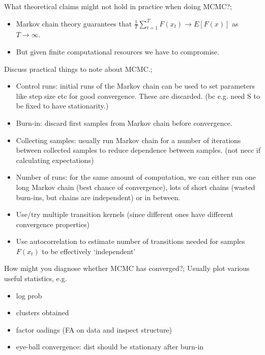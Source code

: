 \documentclass{article}
\begin{document}
What theoretical claims might not hold in practice when doing MCMC?; \begin{itemize}
    \item Markov chain theory guarantees that $\frac{1}{T}\sum_{t=1}^T F(x_t)\rightarrow E[F(x)]$ as $T\rightarrow \infty$.
    \item But given finite computational resources we have to compromise.
\end{itemize}

Discuss practical things to note about MCMC.; \begin{itemize}
    \item Control runs: initial runs of the Markov chain can be used to set parameters like step size etc for good convergence. These are discarded. (bc e.g. need S to be fixed to have stationarity.)
    \item Burn-in: discard first samples from Markov chain before convergence.
    \item Collecting samples: usually run Markov chain for a number of iterations between collected samples to reduce dependence between samples. (not necc if calculating expectations)
    \item Number of runs: for the same amount of computation, we can either run one long Markov chain (best chance of convergence), lots of short chains (wasted burn-ins, but chains are independent) or in between.
    \item Use/try multiple transition kernels (since different ones have different convergence properties)
    \item Use autocorrelation to estimate number of transitions needed for samples $F(x_t)$ to be effectively `independent'
\end{itemize}

How might you diagnose whether MCMC has converged?; Usually plot various useful statistics, e.g. \begin{itemize}
    \item log prob
    \item clusters obtained
    \item factor oadings (FA on data and inspect structure)
    \item eye-ball convergence: dist should be stationary after burn-in
\end{itemize}
\end{document}
